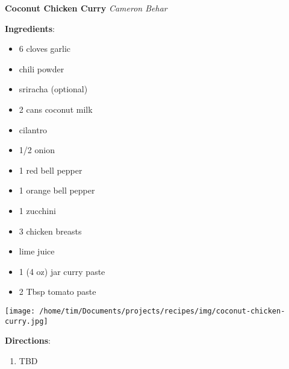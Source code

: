 \documentclass[11pt, twoside, openany]{book}
\begin{document}
\noindent\begin{minipage}[t]{\linewidth}%
{\Large\textbf{Coconut Chicken Curry}} \label{coconut-chicken-curry}\hfill\textit{Cameron Behar}\\
\noindent\begin{minipage}[t]{0.78\linewidth}%
\textbf{Ingredients}:\vspace{-3mm}
\begin{multicols}{2}
\begin{itemize}\setlength\itemsep{-1mm}
\item 6 cloves garlic
\item chili powder
\item sriracha (optional)
\item 2 cans coconut milk
\item cilantro
\item 1/2 onion
\item 1 red bell pepper
\item 1 orange bell pepper
\item 1 zucchini
\item 3 chicken breasts
\item lime juice
\item 1 (4 oz) jar curry paste
\item 2 Tbsp tomato paste
\end{itemize}
\end{multicols}
\end{minipage}
\noindent\begin{minipage}[t]{0.18\linewidth}
\centering \strut\vspace*{-\baselineskip}\newline
\texttt{[image: /home/tim/Documents/projects/recipes/img/coconut-chicken-curry.jpg]}\\
\end{minipage}\vspace{3mm}
\textbf{Directions}:
\vspace{-3mm}\begin{enumerate}\setlength\itemsep{-1mm}
\item TBD
\end{enumerate}
\end{minipage}\vspace{8mm}
\end{document}
